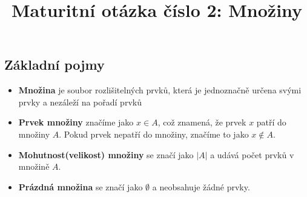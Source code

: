 \documentclass[12pt]{article}
\title{Maturitní otázka číslo 2: Množiny}
\author{}
\date{}
\begin{document}
\maketitle
\subsection*{Základní pojmy}
\begin{itemize}[itemsep = 2pt]
    \item \textbf{Množina} je soubor rozlišitelných prvků, která je jednoznačně určena svými prvky a nezáleží na pořadí prvků
    \item \textbf{Prvek množiny} značíme jako $x \in A$, což znamená, že prvek $x$ patří do množiny $A$. Pokud prvek nepatří do množiny, značíme to jako $x \notin A$.
    \item \textbf{Mohutnost(velikost) množiny} se značí jako $|A|$ a udává počet prvků v množině $A$.
    \item \textbf{Prázdná množina} se značí jako $\emptyset$ a neobsahuje žádné prvky.

\end{itemize}
\end{document}
